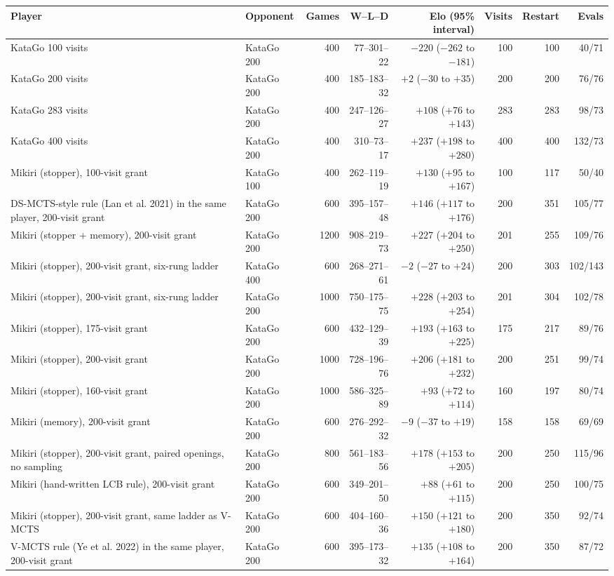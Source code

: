 \begin{tabular}{llrrrrrr}
\toprule
Player & Opponent & Games & W--L--D & Elo (95\% interval) & Visits & Restart & Evals \\
\midrule
KataGo 100 visits & KataGo 200 & 400 & 77--301--22 & $-220$ ($-262$ to $-181$) & 100 & 100 & 40/71 \\
KataGo 200 visits & KataGo 200 & 400 & 185--183--32 & $+2$ ($-30$ to $+35$) & 200 & 200 & 76/76 \\
KataGo 283 visits & KataGo 200 & 400 & 247--126--27 & $+108$ ($+76$ to $+143$) & 283 & 283 & 98/73 \\
KataGo 400 visits & KataGo 200 & 400 & 310--73--17 & $+237$ ($+198$ to $+280$) & 400 & 400 & 132/73 \\
Mikiri (stopper), 100-visit grant & KataGo 100 & 400 & 262--119--19 & $+130$ ($+95$ to $+167$) & 100 & 117 & 50/40 \\
DS-MCTS-style rule (Lan et al. 2021) in the same player, 200-visit grant & KataGo 200 & 600 & 395--157--48 & $+146$ ($+117$ to $+176$) & 200 & 351 & 105/77 \\
Mikiri (stopper + memory), 200-visit grant & KataGo 200 & 1200 & 908--219--73 & $+227$ ($+204$ to $+250$) & 201 & 255 & 109/76 \\
Mikiri (stopper), 200-visit grant, six-rung ladder & KataGo 400 & 600 & 268--271--61 & $-2$ ($-27$ to $+24$) & 200 & 303 & 102/143 \\
Mikiri (stopper), 200-visit grant, six-rung ladder & KataGo 200 & 1000 & 750--175--75 & $+228$ ($+203$ to $+254$) & 201 & 304 & 102/78 \\
Mikiri (stopper), 175-visit grant & KataGo 200 & 600 & 432--129--39 & $+193$ ($+163$ to $+225$) & 175 & 217 & 89/76 \\
Mikiri (stopper), 200-visit grant & KataGo 200 & 1000 & 728--196--76 & $+206$ ($+181$ to $+232$) & 200 & 251 & 99/74 \\
Mikiri (stopper), 160-visit grant & KataGo 200 & 1000 & 586--325--89 & $+93$ ($+72$ to $+114$) & 160 & 197 & 80/74 \\
Mikiri (memory), 200-visit grant & KataGo 200 & 600 & 276--292--32 & $-9$ ($-37$ to $+19$) & 158 & 158 & 69/69 \\
Mikiri (stopper), 200-visit grant, paired openings, no sampling & KataGo 200 & 800 & 561--183--56 & $+178$ ($+153$ to $+205$) & 200 & 250 & 115/96 \\
Mikiri (hand-written LCB rule), 200-visit grant & KataGo 200 & 600 & 349--201--50 & $+88$ ($+61$ to $+115$) & 200 & 250 & 100/75 \\
Mikiri (stopper), 200-visit grant, same ladder as V-MCTS & KataGo 200 & 600 & 404--160--36 & $+150$ ($+121$ to $+180$) & 200 & 350 & 92/74 \\
V-MCTS rule (Ye et al. 2022) in the same player, 200-visit grant & KataGo 200 & 600 & 395--173--32 & $+135$ ($+108$ to $+164$) & 200 & 350 & 87/72 \\
\bottomrule
\end{tabular}
